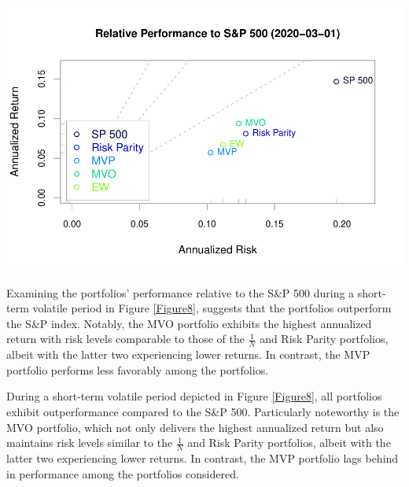 \documentclass[12pt,preprint, authoryear]{elsarticle}
\let\origfigure\figure
\let\endorigfigure\endfigure
\renewenvironment{figure}[1][2] {
    \expandafter\origfigure\expandafter[H]
} {
    \endorigfigure
}
\numberwithin{equation}{section}
\numberwithin{figure}{section}
\numberwithin{table}{section}
\begin{document}
\begin{figure}[H]

{\centering \includegraphics{Finmetrics_Project_files/figure-latex/Figure7-1} 

}

\caption{Annualized Risk-return performance of portfolios relative to SP 500 since March 2020 \label{Figure7}}\label{fig:Figure7}
\end{figure}

Examining the portfolios' performance relative to the S\&P 500 during a
short-term volatile period in Figure \ref{Figure8}, suggests that the
portfolios outperform the S\&P index. Notably, the MVO portfolio
exhibits the highest annualized return with risk levels comparable to
those of the \(\frac{1}{N}\) and Risk Parity portfolios, albeit with the
latter two experiencing lower returns. In contrast, the MVP portfolio
performs less favorably among the portfolios.

During a short-term volatile period depicted in Figure \ref{Figure8},
all portfolios exhibit outperformance compared to the S\&P 500.
Particularly noteworthy is the MVO portfolio, which not only delivers
the highest annualized return but also maintains risk levels similar to
the \(\frac{1}{N}\) and Risk Parity portfolios, albeit with the latter
two experiencing lower returns. In contrast, the MVP portfolio lags
behind in performance among the portfolios considered.
\end{document}

